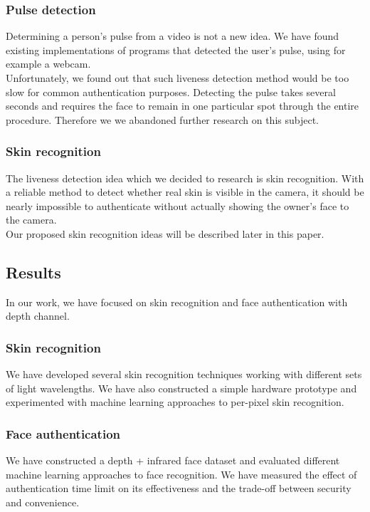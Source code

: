         \subsubsection*{Pulse detection}
            Determining a person's pulse from a video is not a new idea.
            We have found existing implementations of programs that detected the user's
            pulse, using for example a webcam.\\
            Unfortunately, we found out that such liveness detection method would be
            too slow for common authentication purposes.
            Detecting the pulse takes several seconds and requires the face to remain
            in one particular spot through the entire procedure.
            Therefore we we abandoned further research on this subject.

        \subsubsection*{Skin recognition}
            The liveness detection idea which we decided to research is skin recognition.
            With a reliable method to detect whether real skin is visible in the camera,
            it should be nearly impossible to authenticate without actually showing
            the owner's face to the camera.\\
            Our proposed skin recognition ideas will be described later in this paper.

    \subsection{Results}
        In our work, we have focused on skin recognition and face authentication
        with depth channel.

        \subsubsection*{Skin recognition}
            We have developed several skin recognition techniques working with different
            sets of light wavelengths. We have also constructed a simple hardware prototype
            and experimented with machine learning approaches to per-pixel skin recognition.

        \subsubsection*{Face authentication}
            We have constructed a depth + infrared face dataset and evaluated different
            machine learning approaches to face recognition. We have measured the
            effect of authentication time limit on its effectiveness and the trade-off
            between security and convenience.
